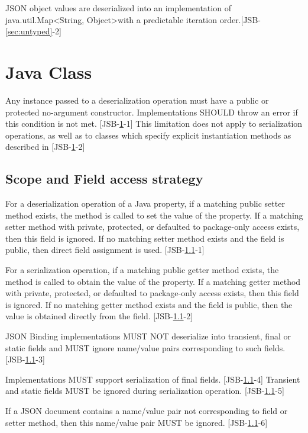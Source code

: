 JSON object values are deserialized into an implementation of java.util.Map\textless String, Object\textgreater\space with a predictable iteration order.[JSB-\ref{sec:untyped}-2]

\section{Java Class}
\label{sec:class}
Any instance passed to a deserialization operation must have a public or protected no-argument constructor. Implementations SHOULD throw an error if this condition is not met. [JSB-\ref{sec:class}-1] This limitation does not apply to serialization operations, as well as to classes which specify explicit instantiation methods as described in  [JSB-\ref{sec:class}-2]

\subsection{Scope and Field access strategy}
\label{subsec:fieldstrategy}
For a deserialization operation of a Java property, if a matching public setter method exists, the method is called to set the value of the property. 
If a matching setter method with private, protected, or defaulted to package-only access exists, then this field is ignored. 
If no matching setter method exists and the field is public, then direct field assignment is used. [JSB-\ref{subsec:fieldstrategy}-1]

For a serialization operation, if a matching public getter method exists, the method is called to obtain the value of the property. 
If a matching getter method with private, protected, or defaulted to package-only access exists, then this field is ignored. 
If no matching getter method exists and the field is public, then the value is obtained directly from the field. [JSB-\ref{subsec:fieldstrategy}-2]

JSON Binding implementations MUST NOT deserialize into transient, final or static fields and MUST ignore name/value pairs corresponding to such fields. [JSB-\ref{subsec:fieldstrategy}-3]

Implementations MUST support serialization of final fields. [JSB-\ref{subsec:fieldstrategy}-4] Transient and static fields MUST be ignored during serialization operation. [JSB-\ref{subsec:fieldstrategy}-5]

If a JSON document contains a name/value pair not corresponding to field or setter method, then this name/value pair MUST be ignored. [JSB-\ref{subsec:fieldstrategy}-6]

